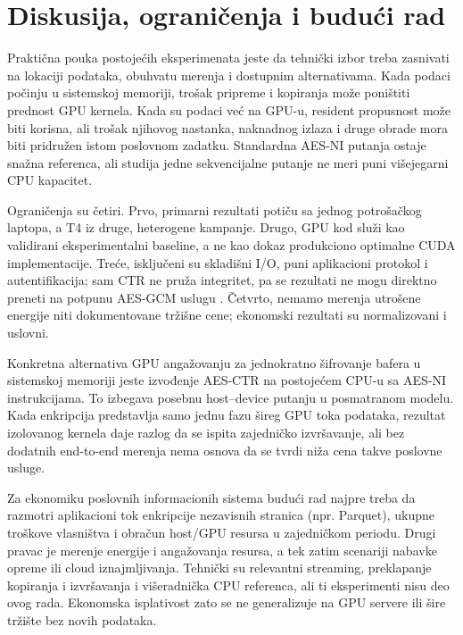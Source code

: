 \documentclass[11pt,b5paper]{article}
\begin{document}
\section{Diskusija, ograničenja i budući rad}
Praktična pouka postojećih eksperimenata jeste da tehnički izbor treba zasnivati na lokaciji podataka, obuhvatu merenja i dostupnim alternativama. Kada podaci počinju u sistemskoj memoriji, trošak pripreme i kopiranja može poništiti prednost GPU kernela. Kada su podaci već na GPU-u, resident propusnost može biti korisna, ali trošak njihovog nastanka, naknadnog izlaza i druge obrade mora biti pridružen istom poslovnom zadatku. Standardna AES-NI putanja ostaje snažna referenca, ali studija jedne sekvencijalne putanje ne meri puni višejegarni CPU kapacitet.\par
Ograničenja su četiri. Prvo, primarni rezultati potiču sa jednog potrošačkog laptopa, a T4 iz druge, heterogene kampanje. Drugo, GPU kod služi kao validirani eksperimentalni baseline, a ne kao dokaz produkciono optimalne CUDA implementacije. Treće, isključeni su skladišni I/O, puni aplikacioni protokol i autentifikacija; sam CTR ne pruža integritet, pa se rezultati ne mogu direktno preneti na potpunu AES-GCM uslugu \citep{nist_gcm2007}. Četvrto, nemamo merenja utrošene energije niti dokumentovane tržišne cene; ekonomski rezultati su normalizovani i uslovni.\par
Konkretna alternativa GPU angažovanju za jednokratno šifrovanje bafera u sistemskoj memoriji jeste izvođenje AES-CTR na postojećem CPU-u sa AES-NI instrukcijama. To izbegava posebnu host--device putanju u posmatranom modelu. Kada enkripcija predstavlja samo jednu fazu šireg GPU toka podataka, rezultat izolovanog kernela daje razlog da se ispita zajedničko izvršavanje, ali bez dodatnih end-to-end merenja nema osnova da se tvrdi niža cena takve poslovne usluge.\par
Za ekonomiku poslovnih informacionih sistema budući rad najpre treba da razmotri aplikacioni tok enkripcije nezavisnih stranica (npr. Parquet), ukupne troškove vlasništva i obračun host/GPU resursa u zajedničkom periodu. Drugi pravac je merenje energije i angažovanja resursa, a tek zatim scenariji nabavke opreme ili cloud iznajmljivanja. Tehnički su relevantni streaming, preklapanje kopiranja i izvršavanja i višeradnička CPU referenca, ali ti eksperimenti nisu deo ovog rada. Ekonomska isplativost zato se ne generalizuje na GPU servere ili šire tržište bez novih podataka.\par
\end{document}

